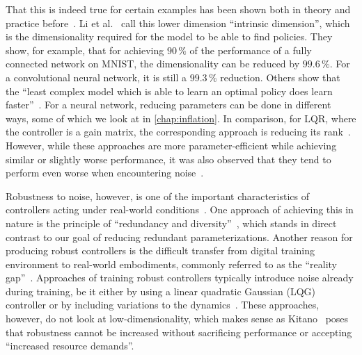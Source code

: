 That this is indeed true for certain examples has been shown both in theory and practice
before~\cite{Datar2025Universal,Montufar2015Geometry,Li2018Measuring}. Li et
al.~\cite{Li2018Measuring} call this lower dimension ``intrinsic dimension'', which is the
dimensionality required for the model to be able to find policies. They show, for example, that
for achieving $90\,\%$ of the performance of a fully connected network on MNIST,
the dimensionality can be reduced by $99.6\,\%$. For a convolutional neural
network, it is still a $99.3\,\%$ reduction.
Others show that the ``least complex model which is able to learn
an optimal policy does learn faster''~\cite{Montufar2015Geometry}. For a neural network, reducing
parameters can be done in different ways, some of which we look at in
\cref{chap:inflation}. In comparison, for LQR, where the controller is a gain matrix, the
corresponding approach is reducing its rank~\cite{Recht2010Guaranteed}. However, while these
approaches are more parameter-efficient while achieving similar or slightly worse performance, it
was also observed that they tend to perform even worse when encountering
noise~\cite{Datar2025Universal}.

Robustness to noise, however, is one of the important characteristics of controllers acting under
real-world conditions~\cite{Rao2001Naive,Roy2021MachineLearning}. One approach of achieving this
in nature is the principle of ``redundancy and diversity''~\cite{Kitano2004Biological}, which stands
in direct contrast to our goal of reducing redundant parameterizations. Another reason for producing
robust controllers is the difficult transfer from digital training environment to real-world
embodiments, commonly referred to as the ``reality gap''~\cite{Tobin2017Domain,Peng2018SimToReal}.
Approaches of training robust controllers typically introduce noise already during training, be it
either by using a linear quadratic Gaussian (LQG) controller or by including variations to the
dynamics~\cite{Rao2001Naive,Peng2018SimToReal}.
These approaches, however, do not look at low-dimensionality, which makes sense as
Kitano~\cite[p.~833]{Kitano2004Biological} poses that robustness cannot be increased
without sacrificing performance or accepting ``increased resource
demands''.


